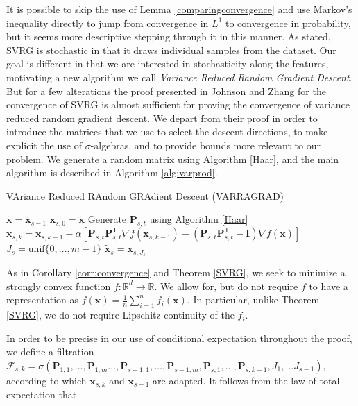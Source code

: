\documentclass[11pt] {article}
\newcommand{\x}{\pmb{x}}
\renewcommand{\P}{\pmb{P}_{s,t}}
\newcommand{\I}{\pmb{I}}
\newcommand{\T}{\mathsf{T}}
\newcommand{\reals}{\mathbb{R}}
\begin{document}
It is possible to skip the use of Lemma \ref{comparingconvergence} and use Markov's inequality directly to jump from convergence in $L^1$ to convergence in probability, but it seems more descriptive stepping through it in this manner. 
%
As stated, SVRG is stochastic in that it draws individual samples from the dataset. Our goal is different in that we are interested in stochasticity along the features, motivating a new algorithm we call \emph{Variance Reduced Random Gradient Descent}. But for a few alterations the proof presented in Johnson and Zhang \cite{SVRG} for the convergence of SVRG is almost sufficient for proving the convergence of variance reduced random gradient descent. We depart from their proof in order to introduce the matrices that we use to select the descent directions, to make explicit the use of $\sigma$-algebras, and to provide bounds more relevant to our problem. We generate a random matrix using Algorithm \ref{Haar}, and the main algorithm is described in Algorithm \ref{alg:varprod}.


\begin{algorithm}
	\caption{VAriance Reduced RAndom GRAdient Descent (VARRAGRAD)}\label{alg:varprod}
	\begin{algorithmic}
		\Initialize{ $\tilde{\x}_0$}
		
		\State $\tilde{\x} = \tilde{\x}_{s-1}$
		\State $\x_{s,0} = \tilde{\x}$
		\State Generate $\P$ using Algorithm \ref{Haar}
		\State $\x_{s,k} = \x_{s,k-1} - \alpha \left[\P\P^{\T}\nabla f(\x_{s,k-1}) - \left(\P\P^{\T}-\I\right)\nabla f(\tilde{\x}) \right]$
		\EndFor
		\State $J_s = \text{unif}\{0, \ldots, m-1\}$
		\State $\tilde{\x}_s = \x_{s,J_s}$
		\EndFor
	\end{algorithmic}
\end{algorithm}

As in Corollary \ref{corr:convergence} and Theorem \ref{SVRG}, we seek to minimize a strongly convex function $f : \reals^d \to \reals$. We allow for, but do not require $f$ to have a representation as $f(\x) = \frac{1}{n}\sum_{i=1}^n f_i(\x)$. In particular, unlike Theorem \ref{SVRG}, we do not require Lipschitz continuity of the $f_i$.

In order to be precise in our use of conditional expectation throughout the proof, we define a filtration $\mathcal{F}_{s,k} = \sigma(\pmb{P}_{1,1}, \ldots, \pmb{P}_{1,m} \ldots, \pmb{P}_{s-1,1},\ldots,  \pmb{P}_{s-1,m}, \pmb{P}_{s,1},\ldots,  \pmb{P}_{s,k-1}  , J_1, \ldots J_{s-1})$, according to which $\x_{s,k}$ and $\tilde{\x}_{s-1}$ are adapted. It follows from the law of total expectation that 
\end{document}

